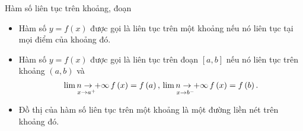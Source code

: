 \begin{dang}{Hàm số liên tục trên khoảng, đoạn}
	\begin{itemize}
		\item Hàm số $y=f(x)$ được gọi là liên tục trên một khoảng nếu nó liên tục tại mọi điểm của khoảng đó.
		\item Hàm số $y=f(x)$ được gọi là liên tục trên đoạn $[a,b]$ nếu nó liên tục trên khoảng $(a,b)$ và $$\mathop {\lim \limits{n \to +\infty}}\limits_{x \to {a^ + }} f\left( x \right) = f\left( a \right),{\rm{   }}\mathop {\lim \limits{n \to +\infty}}\limits_{x \to {b^ - }} f\left( x \right) = f\left( b \right).$$
		\item Đồ thị của hàm số liên tục trên một khoảng là một đường liền nét trên khoảng đó.
	\end{itemize}
\end{dang}
